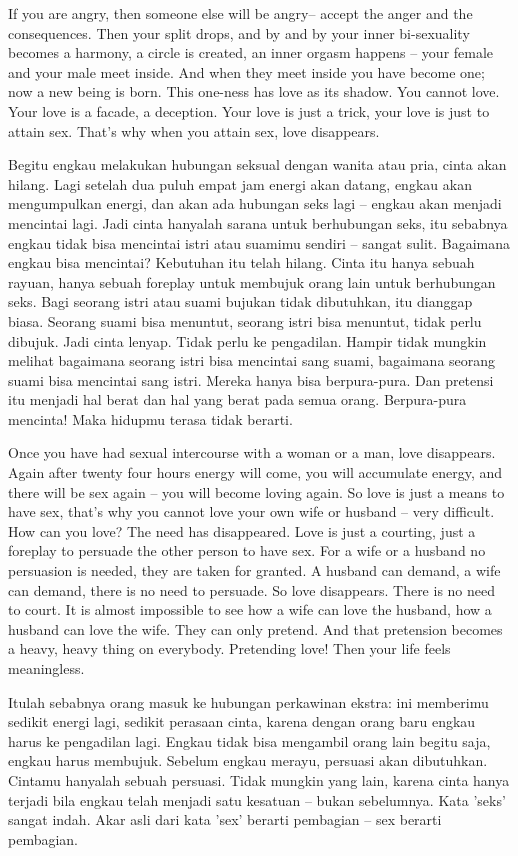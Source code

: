 \english
If you are angry, then someone else will be angry-- accept the anger and the consequences. Then your split drops, and by and by your inner bi-sexuality becomes a harmony, a circle is created, an inner orgasm happens -- your female and your male meet inside. And when they meet inside you have become one; now a new being is born. This one-ness has love as its shadow. You cannot love. Your love is a facade, a deception. Your love is just a trick, your love is just to attain sex. That's why when you attain sex, love disappears.

\bahasa
Begitu engkau melakukan hubungan seksual dengan wanita atau pria, cinta akan hilang. Lagi setelah dua puluh empat jam energi akan datang, engkau akan mengumpulkan energi, dan akan ada hubungan seks lagi -- engkau akan menjadi mencintai lagi. Jadi cinta hanyalah sarana untuk berhubungan seks, itu sebabnya engkau tidak bisa mencintai istri atau suamimu sendiri -- sangat sulit. Bagaimana engkau bisa mencintai? Kebutuhan itu telah hilang. Cinta itu hanya sebuah rayuan, hanya sebuah foreplay untuk membujuk orang lain untuk berhubungan seks. Bagi seorang istri atau suami bujukan tidak dibutuhkan, itu dianggap biasa. Seorang suami bisa menuntut, seorang istri bisa menuntut, tidak perlu dibujuk. Jadi cinta lenyap. Tidak perlu ke pengadilan. Hampir tidak mungkin melihat bagaimana seorang istri bisa mencintai sang suami, bagaimana seorang suami bisa mencintai sang istri. Mereka hanya bisa berpura-pura. Dan pretensi itu menjadi hal berat dan hal yang berat pada semua orang. Berpura-pura mencinta! Maka hidupmu terasa tidak berarti.

\english
Once you have had sexual intercourse with a woman or a man, love disappears. Again after twenty four hours energy will come, you will accumulate energy, and there will be sex again -- you will become loving again. So love is just a means to have sex, that's why you cannot love your own wife or husband -- very difficult. How can you love? The need has disappeared. Love is just a courting, just a foreplay to persuade the other person to have sex. For a wife or a husband no persuasion is needed, they are taken for granted. A husband can demand, a wife can demand, there is no need to persuade. So love disappears. There is no need to court. It is almost impossible to see how a wife can love the husband, how a husband can love the wife. They can only pretend. And that pretension becomes a heavy, heavy thing on everybody. Pretending love! Then your life feels meaningless.

\bahasa
Itulah sebabnya orang masuk ke hubungan perkawinan ekstra: ini memberimu sedikit energi lagi, sedikit perasaan cinta, karena dengan orang baru engkau harus ke pengadilan lagi. Engkau tidak bisa mengambil orang lain begitu saja, engkau harus membujuk. Sebelum engkau merayu, persuasi akan dibutuhkan. Cintamu hanyalah sebuah persuasi. Tidak mungkin yang lain, karena cinta hanya terjadi bila engkau telah menjadi satu kesatuan -- bukan sebelumnya. Kata 'seks' sangat indah. Akar asli dari kata 'sex' berarti pembagian -- sex berarti pembagian.

